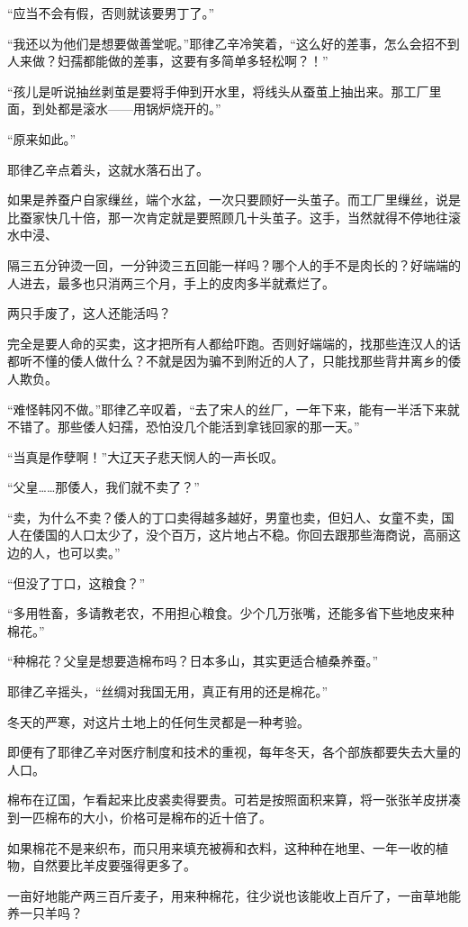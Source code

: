 “应当不会有假，否则就该要男丁了。”

“我还以为他们是想要做善堂呢。”耶律乙辛冷笑着，“这么好的差事，怎么会招不到人来做？妇孺都能做的差事，这要有多简单多轻松啊？！”

“孩儿是听说抽丝剥茧是要将手伸到开水里，将线头从蚕茧上抽出来。那工厂里面，到处都是滚水——用锅炉烧开的。”

“原来如此。”

耶律乙辛点着头，这就水落石出了。

如果是养蚕户自家缫丝，端个水盆，一次只要顾好一头茧子。而工厂里缫丝，说是比蚕家快几十倍，那一次肯定就是要照顾几十头茧子。这手，当然就得不停地往滚水中浸、

隔三五分钟烫一回，一分钟烫三五回能一样吗？哪个人的手不是肉长的？好端端的人进去，最多也只消两三个月，手上的皮肉多半就煮烂了。

两只手废了，这人还能活吗？

完全是要人命的买卖，这才把所有人都给吓跑。否则好端端的，找那些连汉人的话都听不懂的倭人做什么？不就是因为骗不到附近的人了，只能找那些背井离乡的倭人欺负。

“难怪韩冈不做。”耶律乙辛叹着，“去了宋人的丝厂，一年下来，能有一半活下来就不错了。那些倭人妇孺，恐怕没几个能活到拿钱回家的那一天。”

“当真是作孽啊！”大辽天子悲天悯人的一声长叹。

“父皇……那倭人，我们就不卖了？”

“卖，为什么不卖？倭人的丁口卖得越多越好，男童也卖，但妇人、女童不卖，国人在倭国的人口太少了，没个百万，这片地占不稳。你回去跟那些海商说，高丽这边的人，也可以卖。”

“但没了丁口，这粮食？”

“多用牲畜，多请教老农，不用担心粮食。少个几万张嘴，还能多省下些地皮来种棉花。”

“种棉花？父皇是想要造棉布吗？日本多山，其实更适合植桑养蚕。”

耶律乙辛摇头，“丝绸对我国无用，真正有用的还是棉花。”

冬天的严寒，对这片土地上的任何生灵都是一种考验。

即便有了耶律乙辛对医疗制度和技术的重视，每年冬天，各个部族都要失去大量的人口。

棉布在辽国，乍看起来比皮裘卖得要贵。可若是按照面积来算，将一张张羊皮拼凑到一匹棉布的大小，价格可是棉布的近十倍了。

如果棉花不是来织布，而只用来填充被褥和衣料，这种种在地里、一年一收的植物，自然要比羊皮要强得更多了。

一亩好地能产两三百斤麦子，用来种棉花，往少说也该能收上百斤了，一亩草地能养一只羊吗？


